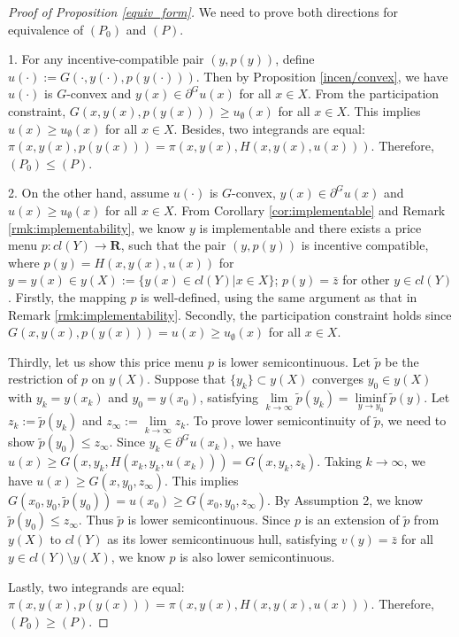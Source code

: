 \documentclass[a4paper, 11pt]{amsart}
\numberwithin{equation}{section}
\theoremstyle{plain}
\theoremstyle{definition}
\theoremstyle{remark}
\newcommand{\R}{\mathbf{R}}
\begin{document}
\begin{proof} [Proof of Proposition \ref{equiv_form}] We need to prove both directions for equivalence of $(P_0)$ and $(P)$.\medskip
	
	1. For any incentive-compatible pair $(y, p(y))$, define $u(\cdot) := G(\cdot,y(\cdot), p(y(\cdot)))$. Then by Proposition \ref{incen/convex}, we have $u(\cdot)$ is $G$-convex and $y(x) \in \partial^G u(x)$ for all $x \in X$. From the participation constraint, $G(x, y(x), p(y(x))) \ge u_{\emptyset}(x)$ for all $x\in X$. This implies $u(x)\ge u_{\emptyset}(x)$ for all $x\in X$. Besides, two integrands are equal: $\pi(x, y(x), p(y(x))) = \pi(x,y(x), H(x,y(x), u(x)))$. Therefore, $(P_0) \le (P)$.\medskip
	
	2. On the other hand, assume $u(\cdot)$ is $G$-convex, $y(x)\in \partial^G u(x)$ and $u(x) \ge u_{\emptyset}(x)$ for all $x \in X$. From Corollary \ref{cor:implementable} and Remark \ref{rmk:implementability}, we know $y$ is implementable and there exists a price menu $p: cl(Y) \rightarrow \R$, such that the pair $(y, p(y))$ is incentive compatible, where $p(y) = H(x,y(x), u(x))$ for $y = y(x) \in y(X) :=\{ y(x) \in cl(Y) | x \in X \}$; $p(y) = \bar{z}$ for other $y\in cl(Y)$. Firstly, the mapping $p$ is well-defined, using the same argument as that in Remark \ref{rmk:implementability}. %
	Secondly, the participation constraint holds since $G(x,y(x), p(y(x))) = u(x) \ge u_{\emptyset}(x)$ for all $x\in X$. \medskip
	
	Thirdly, let us show this price menu $p$ is lower semicontinuous. Let $\tilde{p}$ be the restriction of $p$ on $y(X)$. Suppose that $\{y_k \} \subset y(X)$ converges $y_0 \in y(X)$ with $y_k = y(x_k)$ and $y_0 = y(x_0)$, satisfying $\lim\limits_{k \rightarrow \infty} \tilde{p}(y_k) = \liminf\limits_{y \rightarrow y_{0}} \tilde{p}(y)$.  Let $z_{k}:= \tilde{p}(y_k)$ and $z_{\infty}:=\lim\limits_{k \rightarrow \infty} z_k$. To prove lower semicontinuity of $\tilde{p}$, we need to show $\tilde{p}(y_0)\le z_{\infty}$.  Since $y_k \in \partial^G u(x_k)$, we have $u(x) \ge G(x,y_k, H(x_k, y_k, u(x_k))) = G(x, y_k, z_k)$. Taking $k\rightarrow \infty$, we have $u(x)\ge G(x, y_0, z_{\infty})$. This implies $G(x_0, y_0, \tilde{p}(y_0)) = u(x_0) \ge G(x_0, y_0, z_{\infty})$. By Assumption 2, we know $\tilde{p}(y_0) \le z_{\infty}$. Thus $\tilde{p}$ is lower semicontinuous. Since $p$ is an extension of $\tilde{p}$ from $y(X)$ to $cl(Y)$ as its lower semicontinuous hull, satisfying $v(y)= \bar{z}$ for all $y\in cl(Y)\setminus y(X)$, we know $p$ is also lower semicontinuous.
	\medskip
	
	Lastly, two integrands are equal: $\pi(x, y(x), p(y(x))) = \pi(x,y(x), H(x,y(x), u(x)))$. Therefore, $(P_0) \ge (P)$.
\end{proof}
\end{document}
